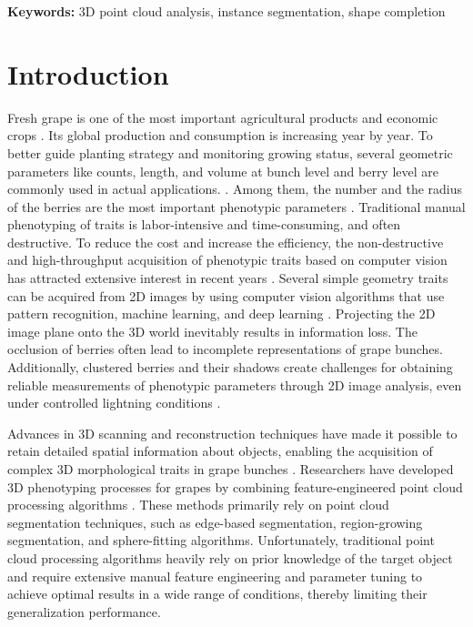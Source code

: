 \documentclass[12pt]{article}
\begin{document}
\textbf{Keywords:} 3D point cloud analysis, instance segmentation, shape completion

\doublespacing

\section{Introduction}
Fresh grape is one of the most important agricultural products and economic crops \citep{alston_grapes_2019, venkitasamy_grapes_2019}. 
Its global production and consumption is increasing year by year. 
To better guide planting strategy and monitoring growing status, several geometric parameters like counts, length, and volume at bunch level and berry level are commonly used in actual applications. \citep{luo_prediction_2024,raihen_prediction_2024,kamangir_largescale_2024,barbole_comparative_2023}. 
Among them, the number and the radius of the berries are the most important phenotypic parameters \citep{sneha_acrescale_2024}. 
Traditional manual phenotyping of traits is labor-intensive and time-consuming, and often destructive. 
To reduce the cost and increase the efficiency, the non-destructive and high-throughput acquisition of phenotypic traits based on computer vision has attracted extensive interest in recent years \citep{li_review_2020}. 
Several simple geometry traits can be acquired from 2D images by using computer vision algorithms that use pattern recognition, machine learning, and deep learning \citep{zabawa_counting_2020}. 
Projecting the 2D image plane onto the 3D world inevitably results in information loss. 
The occlusion of berries often lead to incomplete representations of grape bunches. 
Additionally, clustered berries and their shadows  create challenges for obtaining reliable measurements of phenotypic parameters through 2D image analysis, even under controlled lightning conditions  \citep{fei_comprehensive_2022,xiang_multispace_2023}.

Advances in 3D scanning and reconstruction techniques have made it possible to retain detailed spatial information about objects, enabling the acquisition of complex 3D morphological traits in grape bunches \citep{jiang_3d_2019,ni_threedimensional_2021}. 
Researchers have developed 3D phenotyping processes for grapes by combining feature-engineered point cloud processing algorithms \citep{rose_automated_2016,rist_highprecision_2018}. 
These methods primarily rely on point cloud segmentation techniques, such as edge-based segmentation, region-growing segmentation, and sphere-fitting algorithms. 
Unfortunately, traditional point cloud processing algorithms heavily rely on prior knowledge of the target object and require extensive manual feature engineering and parameter tuning to achieve optimal results in a wide range of conditions, thereby limiting their generalization performance.
\end{document}
